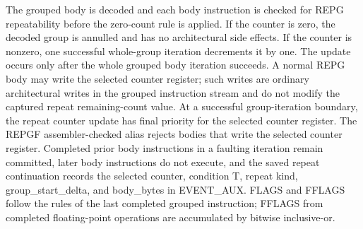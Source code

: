 The grouped body is decoded and each body instruction is checked for REPG repeatability before the zero-count rule is applied. If the counter is zero, the decoded group is annulled and has no architectural side effects. If the counter is nonzero, one successful whole-group iteration decrements it by one. The update occurs only after the whole grouped body iteration succeeds. A normal REPG body may write the selected counter register; such writes are ordinary architectural writes in the grouped instruction stream and do not modify the captured repeat remaining-count value. At a successful group-iteration boundary, the repeat counter update has final priority for the selected counter register. The REPGF assembler-checked alias rejects bodies that write the selected counter register. Completed prior body instructions in a faulting iteration remain committed, later body instructions do not execute, and the saved repeat continuation records the selected counter, condition T, repeat kind, group\_start\_delta, and body\_bytes in EVENT\_AUX. FLAGS and FFLAGS follow the rules of the last completed grouped instruction; FFLAGS from completed floating-point operations are accumulated by bitwise inclusive-or.
